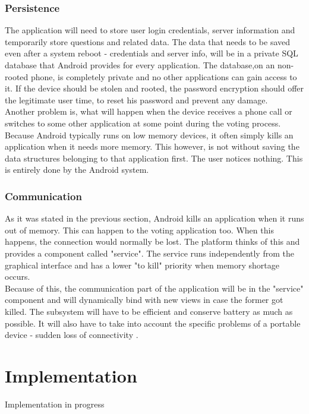 \documentclass[11pt,twoside,a4paper]{book}
\begin{document}
\subsection{Persistence}
The application will need to store user login credentials, server information and temporarily store questions and related data. The data that needs to be saved even after a system reboot - credentials and server info, will be in a private SQL database that Android provides for every application. The database,on an non-rooted\cite{whatIsRoot}  phone,  is completely private and no other applications can gain access to it. If the device should be stolen and rooted, the password encryption should offer the legitimate user time, to reset his password and prevent any damage. \\
Another problem is, what will happen when the device receives a phone call or switches to some other application \cite{bakalarkaJV} at some point during the voting process. Because Android typically runs on low memory devices, it often simply kills an application when it needs more memory. This however, is not without saving the data structures belonging to that application first. The user notices nothing. This is entirely done by the Android system.\\

\subsection{Communication}
As it was stated in the previous section, Android kills an application when it runs out of memory. This can happen to the voting application too. When this happens, the connection would normally be lost. The platform thinks of this and provides a component called "service". The service runs independently from the graphical interface and has a lower "to kill" priority when memory shortage occurs. \\

Because of this, the communication part of the application will be in the "service" component and will dynamically bind with new views in case the former got killed. The subsystem will have to be efficient and conserve battery as much as possible. It will also have to take into account the specific problems of a portable device - sudden loss of connectivity \cite{bakalarkaJV}. 




	
\chapter{Implementation}
Implementation in progress
\end{document}

